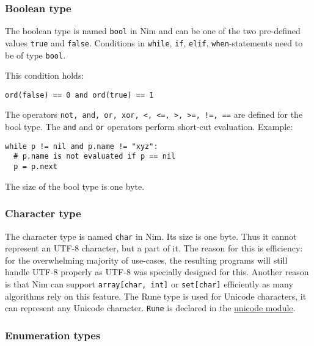 \hypertarget{boolean-type}{%
\subsubsection{Boolean type}\label{boolean-type}}

The boolean type is named \texttt{bool} in Nim and can be one of the two
pre-defined values \texttt{true} and \texttt{false}. Conditions in
\texttt{while}, \texttt{if}, \texttt{elif}, \texttt{when}-statements
need to be of type \texttt{bool}.

This condition holds:

\begin{verbatim}
ord(false) == 0 and ord(true) == 1
\end{verbatim}

The operators
\texttt{not,\ and,\ or,\ xor,\ \textless{},\ \textless{}=,\ \textgreater{},\ \textgreater{}=,\ !=,\ ==}
are defined for the bool type. The \texttt{and} and \texttt{or}
operators perform short-cut evaluation. Example:

\begin{verbatim}
while p != nil and p.name != "xyz":
  # p.name is not evaluated if p == nil
  p = p.next
\end{verbatim}

The size of the bool type is one byte.

\hypertarget{character-type}{%
\subsubsection{Character type}\label{character-type}}

The character type is named \texttt{char} in Nim. Its size is one byte.
Thus it cannot represent an UTF-8 character, but a part of it. The
reason for this is efficiency: for the overwhelming majority of
use-cases, the resulting programs will still handle UTF-8 properly as
UTF-8 was specially designed for this. Another reason is that Nim can
support \texttt{array{[}char,\ int{]}} or \texttt{set{[}char{]}}
efficiently as many algorithms rely on this feature. The {Rune} type is
used for Unicode characters, it can represent any Unicode character.
\texttt{Rune} is declared in the \href{unicode.html}{unicode module}.

\hypertarget{enumeration-types}{%
\subsubsection{Enumeration types}\label{enumeration-types}}

